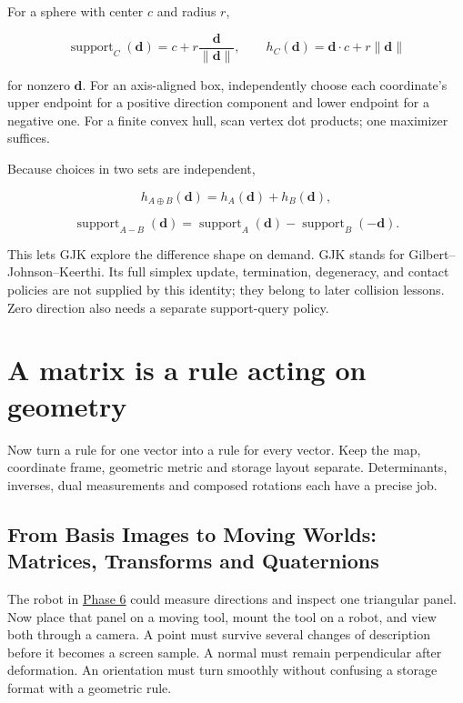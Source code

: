 For a sphere with center \(c\) and radius \(r\),

\[
\operatorname{support}_C(\mathbf d)=c+r\frac{\mathbf d}{\|\mathbf d\|},
\qquad h_C(\mathbf d)=\mathbf d\cdot c+r\|\mathbf d\|
\]

for nonzero \(\mathbf d\). For an axis-aligned box, independently choose each coordinate's upper endpoint for a positive direction component and lower endpoint for a negative one. For a finite convex hull, scan vertex dot products; one maximizer suffices.

Because choices in two sets are independent,

\[
h_{A\oplus B}(\mathbf d)=h_A(\mathbf d)+h_B(\mathbf d),
\]

\[
\operatorname{support}_{A-B}(\mathbf d)
=\operatorname{support}_A(\mathbf d)-\operatorname{support}_B(-\mathbf d).
\]

This lets GJK explore the difference shape on demand. GJK stands for Gilbert--Johnson--Keerthi. Its full simplex update, termination, degeneracy, and contact policies are not supplied by this identity; they belong to later collision lessons. Zero direction also needs a separate support-query policy.

\section{A matrix is a rule acting on geometry}\label{01-foundations-i-ch018-a-matrix-is-a-rule-acting-on-geometry}

Now turn a rule for one vector into a rule for every vector. Keep the map, coordinate frame, geometric metric and storage layout separate. Determinants, inverses, dual measurements and composed rotations each have a precise job.

\subsection{From Basis Images to Moving Worlds: Matrices, Transforms and Quaternions}\label{01-foundations-i-ch018-from-basis-images-to-moving-worlds-matrices-transforms-and-quaternions}

The robot in \hyperref[01-foundations-i-ch017-the-panel-gives-us-a-reason-to-learn]{Phase 6} could measure directions and inspect one triangular panel. Now place that panel on a moving tool, mount the tool on a robot, and view both through a camera. A point must survive several changes of description before it becomes a screen sample. A normal must remain perpendicular after deformation. An orientation must turn smoothly without confusing a storage format with a geometric rule.

